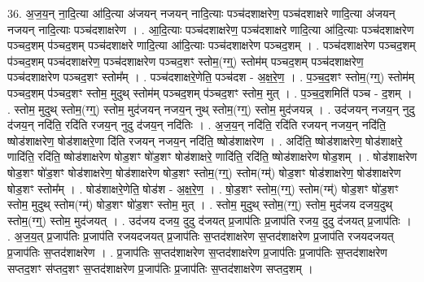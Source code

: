 \documentclass[17pt]{extarticle}
\begin{document}
36. अ॒ज॒य॒न् ना॒दि॒त्या आ॑दि॒त्या अ॑जयन् नजयन् नादि॒त्याः पञ्च॑दशाक्षरेण॒ पञ्च॑दशाक्षरे णादि॒त्या अ॑जयन् नजयन् नादि॒त्याः पञ्च॑दशाक्षरेण । . आ॒दि॒त्याः पञ्च॑दशाक्षरेण॒ पञ्च॑दशाक्षरे णादि॒त्या आ॑दि॒त्याः पञ्च॑दशाक्षरेण पञ्चद॒शम् प॑ञ्चद॒शम् पञ्च॑दशाक्षरे णादि॒त्या आ॑दि॒त्याः पञ्च॑दशाक्षरेण पञ्चद॒शम् । . पञ्च॑दशाक्षरेण पञ्चद॒शम् प॑ञ्चद॒शम् पञ्च॑दशाक्षरेण॒ पञ्च॑दशाक्षरेण पञ्चद॒शꣳ स्तोम॒(ग्ग्॒) स्तोम॑म् पञ्चद॒शम् पञ्च॑दशाक्षरेण॒ पञ्च॑दशाक्षरेण पञ्चद॒शꣳ स्तोम᳚म् । . पञ्च॑दशाक्षरे॒णेति॒ पञ्च॑दश - अ॒क्ष॒रे॒ण॒ । . प॒ञ्च॒द॒शꣳ स्तोम॒(ग्ग्॒) स्तोम॑म् पञ्चद॒शम् प॑ञ्चद॒शꣳ स्तोम॒ मुदुथ् स्तोम॑म् पञ्चद॒शम् प॑ञ्चद॒शꣳ स्तोम॒ मुत् । . प॒ञ्च॒द॒शमिति॑ पञ्च - द॒शम् । . स्तोम॒ मुदुथ् स्तोम॒(ग्ग्॒) स्तोम॒ मुद॑जयन् नजय॒न् नुथ् स्तोम॒(ग्ग्॒) स्तोम॒ मुद॑जयन्न् । . उद॑जयन् नजय॒न् नुदु द॑जय॒न् नदि॑ति॒ रदि॑ति रजय॒न् नुदु द॑जय॒न् नदि॑तिः । . अ॒ज॒य॒न् नदि॑ति॒ रदि॑ति रजयन् नजय॒न् नदि॑ति॒ ष्षोड॑शाक्षरेण॒ षोड॑शाक्षरे॒णा दि॑ति रजयन् नजय॒न् नदि॑ति॒ ष्षोड॑शाक्षरेण । . अदि॑ति॒ ष्षोड॑शाक्षरेण॒ षोड॑शाक्षरे॒ णादि॑ति॒ रदि॑ति॒ ष्षोड॑शाक्षरेण षोड॒शꣳ षो॑ड॒शꣳ षोड॑शाक्षरे॒ णादि॑ति॒ रदि॑ति॒ ष्षोड॑शाक्षरेण षोड॒शम् । . षोड॑शाक्षरेण षोड॒शꣳ षो॑ड॒शꣳ षोड॑शाक्षरेण॒ षोड॑शाक्षरेण षोड॒शꣳ स्तोम॒(ग्ग्॒) स्तोम(ग्म्॑) षोड॒शꣳ षोड॑शाक्षरेण॒ षोड॑शाक्षरेण षोड॒शꣳ स्तोम᳚म् । . षोड॑शाक्षरे॒णेति॒ षोड॑श - अ॒क्ष॒रे॒ण॒ । . षो॒ड॒शꣳ स्तोम॒(ग्ग्॒) स्तोम(ग्म्॑) षोड॒शꣳ षो॑ड॒शꣳ स्तोम॒ मुदुथ् स्तोम(ग्म्॑) षोड॒शꣳ षो॑ड॒शꣳ स्तोम॒ मुत् । . स्तोम॒ मुदुथ् स्तोम॒(ग्ग्॒) स्तोम॒ मुद॑जय दजय॒दुथ् स्तोम॒(ग्ग्॒) स्तोम॒ मुद॑जयत् । . उद॑जय दजय॒ दुदु द॑जयत् प्र॒जाप॑तिः प्र॒जाप॑ति रजय॒ दुदु द॑जयत् प्र॒जाप॑तिः । . अ॒ज॒य॒त् प्र॒जाप॑तिः प्र॒जाप॑ति रजयदजयत् प्र॒जाप॑तिः स॒प्तद॑शाक्षरेण स॒प्तद॑शाक्षरेण प्र॒जाप॑ति रजयदजयत् प्र॒जाप॑तिः स॒प्तद॑शाक्षरेण । . प्र॒जाप॑तिः स॒प्तद॑शाक्षरेण स॒प्तद॑शाक्षरेण प्र॒जाप॑तिः प्र॒जाप॑तिः स॒प्तद॑शाक्षरेण सप्तद॒शꣳ स॑प्तद॒शꣳ स॒प्तद॑शाक्षरेण प्र॒जाप॑तिः प्र॒जाप॑तिः स॒प्तद॑शाक्षरेण सप्तद॒शम् । \newline
\end{document}
